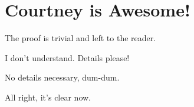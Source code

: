 \documentclass{amsart}
\begin{document}
\section{Courtney is Awesome!}

The proof is trivial and left to the reader.

I don't understand. Details please!

No details necessary, dum-dum.

All right, it's clear now.
\end{document}
